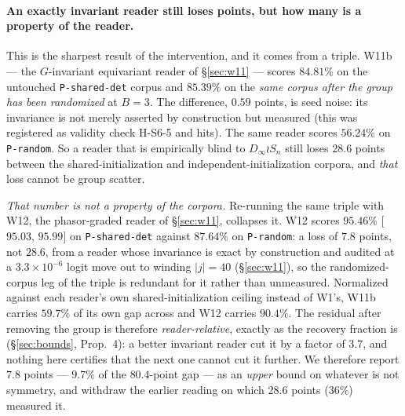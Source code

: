 \documentclass[10pt,letterpaper]{article}
\theoremstyle{definition}
\newcommand{\Dinf}{D_\infty}
\begin{document}
\paragraph{An exactly invariant reader still loses points, but how many is a property of the
reader.} This is the sharpest result of the intervention, and it comes from a triple. W11b --- the
$G$-invariant equivariant reader of \S\ref{sec:w11} --- scores $84.81\%$ on the untouched
\texttt{P-shared-det} corpus and $85.39\%$ on the \emph{same corpus after the group has been
randomized} at $B=3$. The difference, $0.59$ points, is seed noise: its invariance is not merely
asserted by construction but measured (this was registered as validity check H-S6-5 and hits). The
same reader scores $56.24\%$ on \texttt{P-random}. So a reader that is empirically blind to
$\Dinf \wr S_n$ still loses $28.6$ points between the shared-initialization and
independent-initialization corpora, and \emph{that} loss cannot be group scatter.

\emph{That number is not a property of the corpora.} Re-running the same triple with W12, the
phasor-graded reader of \S\ref{sec:w11}, collapses it. W12 scores $95.46\%$ [$95.03$, $95.99$] on
\texttt{P-shared-det} against $87.64\%$ on \texttt{P-random}: a loss of $7.8$ points, not $28.6$,
from a reader whose invariance is exact by construction and audited at a $3.3\times10^{-6}$ logit
move out to winding $|j|=40$ (\S\ref{sec:w11}), so the randomized-corpus leg of the triple is
redundant for it rather than unmeasured. Normalized against each reader's own shared-initialization
ceiling instead of W1's, W11b carries $59.7\%$ of its own gap across and W12 carries $90.4\%$. The
residual after removing the group is therefore \emph{reader-relative}, exactly as the recovery
fraction is (\S\ref{sec:bounds}, Prop.~4): a better invariant reader cut it by a factor of $3.7$,
and nothing here certifies that the next one cannot cut it further. We therefore report $7.8$ points
--- $9.7\%$ of the $80.4$-point gap --- as an \emph{upper} bound on whatever is not symmetry, and
withdraw the earlier reading on which $28.6$ points ($36\%$) measured it.
\end{document}
